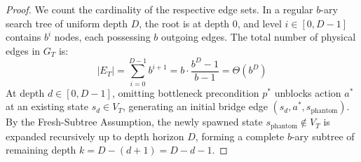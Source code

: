 \documentclass[11pt,a4paper]{article}
\theoremstyle{definition}
\theoremstyle{remark}
\begin{document}
\begin{proof}
We count the cardinality of the respective edge sets.
In a regular $b$-ary search tree of uniform depth $D$, the root is at depth $0$, and level $i \in [0, D-1]$ contains $b^i$ nodes, each possessing $b$ outgoing edges. The total number of physical edges in $G_T$ is:
\begin{equation}
    |E_T| = \sum_{i=0}^{D-1} b^{i+1} = b \cdot \frac{b^D - 1}{b - 1} = \Theta(b^D)
\end{equation}
At depth $d \in [0, D-1]$, omitting bottleneck precondition $p^*$ unblocks action $a^*$ at an existing state $s_d \in V_T$, generating an initial bridge edge $(s_d, a^*, s_{\text{phantom}})$.
By the Fresh-Subtree Assumption, the newly spawned state $s_{\text{phantom}} \notin V_T$ is expanded recursively up to depth horizon $D$, forming a complete $b$-ary subtree of remaining depth $k = D - (d + 1) = D - d - 1$.


\end{proof}
\end{document}
